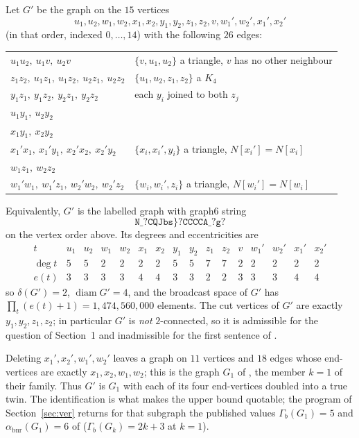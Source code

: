 \documentclass[11pt]{amsart}
\theoremstyle{remark}
\DeclareMathOperator{\bnr}{bnr}
\newcommand{\abnr}{\alpha_{\bnr}}
\newcommand{\Gb}{\Gamma_{b}}
\newcommand{\Gp}{G'}
\begin{document}
Let $\Gp$ be the graph on the $15$ vertices
\[
 u_1,u_2,w_1,w_2,x_1,x_2,y_1,y_2,z_1,z_2,v,w_1',w_2',x_1',x_2'
\]
(in that order, indexed $0,\ldots,14$) with the following $26$ edges:
\begin{center}
\begin{tabular}{ll}
$u_1u_2,\ u_1v,\ u_2v$ & $\{v,u_1,u_2\}$ a triangle, $v$ has no other neighbour\\
$z_1z_2,\ u_1z_1,\ u_1z_2,\ u_2z_1,\ u_2z_2$ & $\{u_1,u_2,z_1,z_2\}$ a $K_4$\\
$y_1z_1,\ y_1z_2,\ y_2z_1,\ y_2z_2$ & each $y_i$ joined to both $z_j$\\
$u_1y_1,\ u_2y_2$ &\\
$x_1y_1,\ x_2y_2$ &\\
$x_1'x_1,\ x_1'y_1,\ x_2'x_2,\ x_2'y_2$ & $\{x_i,x_i',y_i\}$ a triangle,
   $N[x_i']=N[x_i]$\\
$w_1z_1,\ w_2z_2$ &\\
$w_1'w_1,\ w_1'z_1,\ w_2'w_2,\ w_2'z_2$ & $\{w_i,w_i',z_i\}$ a triangle,
   $N[w_i']=N[w_i]$
\end{tabular}
\end{center}
Equivalently, $\Gp$ is the labelled graph with graph6 string
\[
 \texttt{N\_?CQJbs\}?CCCCA\_?g?}
\]
on the vertex order above. Its degrees and eccentricities are
\[
\begin{array}{l|ccccccccccccccc}
 t   & u_1&u_2&w_1&w_2&x_1&x_2&y_1&y_2&z_1&z_2&v&w_1'&w_2'&x_1'&x_2'\\\hline
 \deg t & 5&5&2&2&2&2&5&5&7&7&2&2&2&2&2\\
 e(t)   & 3&3&3&3&4&4&3&3&2&2&3&3&3&4&4
\end{array}
\]
so $\delta(\Gp)=2$, $\operatorname{diam}\Gp=4$, and the broadcast space of $\Gp$
has $\prod_t(e(t)+1)=1{,}474{,}560{,}000$ elements. The cut vertices of $\Gp$
are exactly $y_1,y_2,z_1,z_2$; in particular $\Gp$ is \emph{not} $2$-connected,
so it is admissible for the question of Section~1 and inadmissible for the first
sentence of \cite[Question~4]{MN24}.

Deleting $x_1',x_2',w_1',w_2'$ leaves a graph on $11$ vertices and $18$ edges
whose end-vertices are exactly $x_1,x_2,w_1,w_2$; this is the graph $G_1$ of
\cite[Section~4.2]{MN24}, the member $k=1$ of their family. Thus $\Gp$ is $G_1$
with each of its four end-vertices doubled into a true twin. The identification
is what makes the upper bound quotable; the program of
Section~\ref{sec:ver} returns for that subgraph the published values
$\Gb(G_1)=5$ and $\abnr(G_1)=6$ of \cite[Propositions 4.7 and 4.8]{MN24}
($\Gb(G_k)=2k+3$ at $k=1$).
\end{document}
